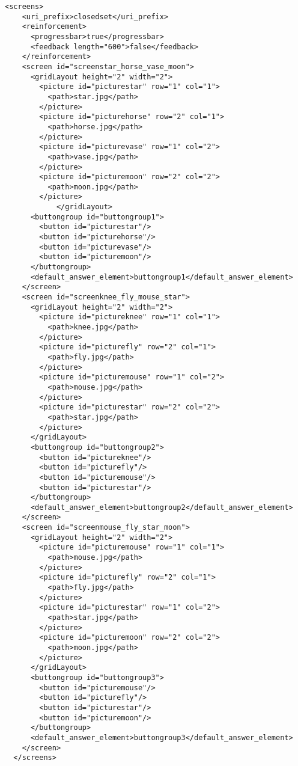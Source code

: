 \begin{lstlisting}
<screens>
    <uri_prefix>closedset</uri_prefix>
    <reinforcement>
      <progressbar>true</progressbar>
      <feedback length="600">false</feedback>
    </reinforcement>
    <screen id="screenstar_horse_vase_moon">
      <gridLayout height="2" width="2">
        <picture id="picturestar" row="1" col="1">
          <path>star.jpg</path>
        </picture>
        <picture id="picturehorse" row="2" col="1">
          <path>horse.jpg</path>
        </picture>
        <picture id="picturevase" row="1" col="2">
          <path>vase.jpg</path>
        </picture>
        <picture id="picturemoon" row="2" col="2">
          <path>moon.jpg</path>
        </picture>
            </gridLayout>
      <buttongroup id="buttongroup1">
        <button id="picturestar"/>
        <button id="picturehorse"/>
        <button id="picturevase"/>
        <button id="picturemoon"/>
      </buttongroup>
      <default_answer_element>buttongroup1</default_answer_element>
    </screen>
    <screen id="screenknee_fly_mouse_star">
      <gridLayout height="2" width="2">
        <picture id="pictureknee" row="1" col="1">
          <path>knee.jpg</path>
        </picture>
        <picture id="picturefly" row="2" col="1">
          <path>fly.jpg</path>
        </picture>
        <picture id="picturemouse" row="1" col="2">
          <path>mouse.jpg</path>
        </picture>
        <picture id="picturestar" row="2" col="2">
          <path>star.jpg</path>
        </picture>
      </gridLayout>
      <buttongroup id="buttongroup2">
        <button id="pictureknee"/>
        <button id="picturefly"/>
        <button id="picturemouse"/>
        <button id="picturestar"/>
      </buttongroup>
      <default_answer_element>buttongroup2</default_answer_element>
    </screen>
    <screen id="screenmouse_fly_star_moon">
      <gridLayout height="2" width="2">
        <picture id="picturemouse" row="1" col="1">
          <path>mouse.jpg</path>
        </picture>
        <picture id="picturefly" row="2" col="1">
          <path>fly.jpg</path>
        </picture>
        <picture id="picturestar" row="1" col="2">
          <path>star.jpg</path>
        </picture>
        <picture id="picturemoon" row="2" col="2">
          <path>moon.jpg</path>
        </picture>
      </gridLayout>
      <buttongroup id="buttongroup3">
        <button id="picturemouse"/>
        <button id="picturefly"/>
        <button id="picturestar"/>
        <button id="picturemoon"/>
      </buttongroup>
      <default_answer_element>buttongroup3</default_answer_element>
    </screen>
  </screens>
\end{lstlisting}

